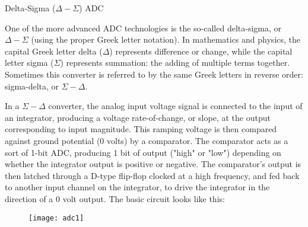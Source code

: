 Delta-Sigma ($\Delta-\Sigma$) ADC

One of the more advanced ADC technologies is the so-called delta-sigma,
or $\Delta-\Sigma$ (using the proper Greek letter notation). In mathematics
and physics, the capital Greek letter delta ($\Delta$) represents difference
or change, while the capital letter sigma ($\Sigma$) represents summation:
the adding of multiple terms together. Sometimes this converter is referred
to by the same Greek letters in reverse order: sigma-delta, or $\Sigma-\Delta$.

In a $\Sigma-\Delta$ converter, the analog input voltage signal is connected
to the input of an integrator, producing a voltage rate-of-change, or slope,
at the output corresponding to input magnitude. This ramping voltage is then
compared against ground potential (0 volts) by a comparator. The comparator
acts as a sort of 1-bit ADC, producing 1 bit of output ("high" or "low")
depending on whether the integrator output is positive or negative. The
comparator's output is then latched through a D-type flip-flop clocked at a
high frequency, and fed back to another input channel on the integrator,
to drive the integrator in the direction of a 0 volt output. The basic
circuit looks like this:

\begin{figure}[!h]
\centering
\texttt{[image: adc1]}
\end{figure}

